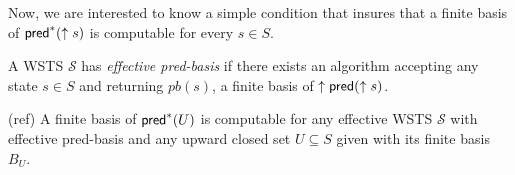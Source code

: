\fi

Now, we are interested to know a simple condition that insures that a finite basis of $\textsf{pred}^*(\uparrow s )$ is computable for every $s \in S$.

\begin{definition}\cite{DBLP:journals/tcs/FinkelS01,DBLP:journals/iandc/AbdullaCJT00}
A WSTS $\mathscr{S}$ has {\em effective pred-basis} if there exists an algorithm accepting
any state $s \in S$ and returning $pb(s)$, a finite basis of $\uparrow \textsf{pred}(\uparrow s)$.
\end{definition}



\begin{theorem}(ref)
A finite basis of $ \textsf{pred}^*(U)$ is computable for any effective WSTS $\mathscr{S}$ with effective pred-basis and any upward closed set $U \subseteq S$ given with its finite basis $B_U$.
\end{theorem}








%
\iffalse
%
\begin{claim}{(stability of upward-closed sets)}
Let $U, V \subseteq S$ be upward-closed. Then the sets $U \cup V$, and $U \cap V$ are upward-closed.
\end{claim}
%
\fi
%



